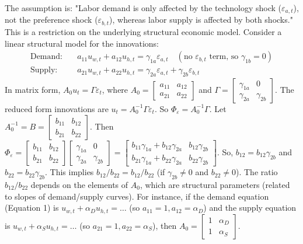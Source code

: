 \documentclass[a4paper,12pt]{article} %
\theoremstyle{nonitalic}
\newenvironment{solution}[1]
  {\renewcommand\theinnercustomsol{#1}%
   \innercustomsol}
  {\endinnercustomsol}
\newcounter{solutionctr}[section]
\renewcommand{\thesolutionctr}{(\alph{solutionctr})}
\newenvironment{autosolution}
  {\refstepcounter{solutionctr}%
   \begin{solution}{\thesolutionctr}}
  {\end{solution}}
\begin{document}
\begin{autosolution}
    The assumption is: "Labor demand is only affected by the technology shock ($\varepsilon_{a,t}$), not the preference shock ($\varepsilon_{b,t}$), whereas labor supply is affected by both shocks."
    This is a restriction on the underlying structural economic model. Consider a linear structural model for the innovations:
    \begin{align*}
        \text{Demand:} \quad & a_{11} u_{w,t} + a_{12} u_{h,t} = \gamma_{1a} \varepsilon_{a,t} \quad (\text{no } \varepsilon_{b,t} \text{ term, so } \gamma_{1b}=0) \\
        \text{Supply:} \quad & a_{21} u_{w,t} + a_{22} u_{h,t} = \gamma_{2a} \varepsilon_{a,t} + \gamma_{2b} \varepsilon_{b,t}
    \end{align*}
    In matrix form, $A_0 u_t = \Gamma \varepsilon_t$, where $A_0 = \begin{bmatrix} a_{11} & a_{12} \\ a_{21} & a_{22} \end{bmatrix}$ and $\Gamma = \begin{bmatrix} \gamma_{1a} & 0 \\ \gamma_{2a} & \gamma_{2b} \end{bmatrix}$.
    The reduced form innovations are $u_t = A_0^{-1} \Gamma \varepsilon_t$. So $\Phi_{\varepsilon} = A_0^{-1} \Gamma$.
    Let $A_0^{-1} = B = \begin{bmatrix} b_{11} & b_{12} \\ b_{21} & b_{22} \end{bmatrix}$.
    Then $\Phi_{\varepsilon} = \begin{bmatrix} b_{11} & b_{12} \\ b_{21} & b_{22} \end{bmatrix} \begin{bmatrix} \gamma_{1a} & 0 \\ \gamma_{2a} & \gamma_{2b} \end{bmatrix} = \begin{bmatrix} b_{11}\gamma_{1a} + b_{12}\gamma_{2a} & b_{12}\gamma_{2b} \\ b_{21}\gamma_{1a} + b_{22}\gamma_{2a} & b_{22}\gamma_{2b} \end{bmatrix}$.
    So, $b_{12} = b_{12}\gamma_{2b}$ and $b_{22} = b_{22}\gamma_{2b}$.
    This implies $b_{12} / b_{22} = b_{12} / b_{22}$ (if $\gamma_{2b} \neq 0$ and $b_{22} \neq 0$).
    The ratio $b_{12} / b_{22}$ depends on the elements of $A_0$, which are structural parameters (related to slopes of demand/supply curves). For instance, if the demand equation (Equation 1) is $u_{w,t} + \alpha_D u_{h,t} = \dots$ (so $a_{11}=1, a_{12}=\alpha_D$) and the supply equation is $u_{w,t} + \alpha_S u_{h,t} = \dots$ (so $a_{21}=1, a_{22}=\alpha_S$), then $A_0 = \begin{bmatrix} 1 & \alpha_D \\ 1 & \alpha_S \end{bmatrix}$.

\end{autosolution}
\end{document}

